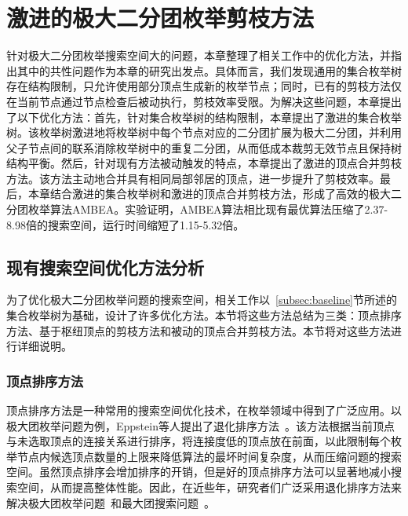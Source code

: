\chapter{激进的极大二分团枚举剪枝方法}
\label{ch:aggressive_mbe}

针对极大二分团枚举搜索空间大的问题，本章整理了相关工作中的优化方法，并指出其中的共性问题作为本章的研究出发点。具体而言，我们发现通用的集合枚举树存在结构限制，只允许使用部分顶点生成新的枚举节点；同时，已有的剪枝方法仅在当前节点通过节点检查后被动执行，剪枝效率受限。为解决这些问题，本章提出了以下优化方法：首先，针对集合枚举树的结构限制，本章提出了激进的集合枚举树。该枚举树激进地将枚举树中每个节点对应的二分团扩展为极大二分团，并利用父子节点间的联系消除枚举树中的重复二分团，从而低成本裁剪无效节点且保持树结构平衡。然后，针对现有方法被动触发的特点，本章提出了激进的顶点合并剪枝方法。该方法主动地合并具有相同局部邻居的顶点，进一步提升了剪枝效率。最后，本章结合激进的集合枚举树和激进的顶点合并剪枝方法，形成了高效的极大二分团枚举算法AMBEA。实验证明，AMBEA算法相比现有最优算法压缩了2.37-8.98倍的搜索空间，运行时间缩短了1.15-5.32倍。

\section{现有搜索空间优化方法分析}
\label{sec:opt}

为了优化极大二分团枚举问题的搜索空间，相关工作以~\ref{subsec:baseline}节所述的集合枚举树为基础，设计了许多优化方法。本节将这些方法总结为三类：顶点排序方法、基于枢纽顶点的剪枝方法和被动的顶点合并剪枝方法。本节将对这些方法进行详细说明。

\subsection{顶点排序方法}
\label{subsec:order}

顶点排序方法是一种常用的搜索空间优化技术，在枚举领域中得到了广泛应用。以极大团枚举问题为例，Eppstein等人提出了退化排序方法~\cite{MCEdegeneracy10}。该方法根据当前顶点与未选取顶点的连接关系进行排序，将连接度低的顶点放在前面，以此限制每个枚举节点内候选顶点数量的上限来降低算法的最坏时间复杂度，从而压缩问题的搜索空间。虽然顶点排序会增加排序的开销，但是好的顶点排序方法可以显著地减小搜索空间，从而提高整体性能。因此，在近些年，研究者们广泛采用退化排序方法来解决极大团枚举问题~\cite{MCEparallel20,MCE20,MCE22,MCE-GPU21,MCE-22}和最大团搜索问题~\cite{MEC20,MEC22}。





